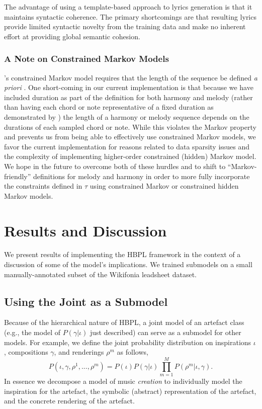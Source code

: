 \documentclass[letterpaper]{article}
\begin{document}
The advantage of using a template-based approach to lyrics generation is that it maintains syntactic coherence. The primary shortcomings are that resulting lyrics provide limited syntactic novelty from the training data and make no inherent effort at providing global semantic cohesion.

\subsubsection{A Note on Constrained Markov Models}

\citeauthor{pachet2001finite}'s constrained Markov model requires that the length of the sequence be defined \emph{a priori} . One short-coming in our current implementation is that because we have included duration as part of the definition for both harmony and melody (rather than having each chord or note representative of a fixed duration as demonstrated by \citeauthor{pachet2014imitative} ) the length of a harmony or melody sequence depends on the durations of each sampled chord or note. While this violates the Markov property and prevents us from being able to effectively use constrained Markov models, we favor the current implementation for reasons related to data sparsity issues and the complexity of implementing higher-order constrained (hidden) Markov model. We hope in the future to overcome both of these hurdles and to shift to ``Markov-friendly'' definitions for melody and harmony in order to more fully incorporate the constraints defined in $\tau$ using constrained Markov or constrained hidden Markov models.

\section{Results and Discussion}

We present results of implementing the HBPL framework in the context of a discussion of some of the model's implications. We trained submodels on a small manually-annotated subset of the Wikifonia leadsheet dataset.

\subsection{Using the Joint as a Submodel}

Because of the hierarchical nature of HBPL, a joint model of an artefact class (e.g., the model of $P(\gamma|\iota)$ just described) can serve as a submodel for other models. For example, we define the joint probability distribution on inspirations $\iota$, compositions $\gamma$, and renderings $\rho^{m}$ as follows,
\[ P(\iota,\gamma,\rho^1, ..., \rho^m) = P(\iota)P(\gamma|\iota) \prod_{m=1}^M P(\rho^m|\iota,\gamma). \]
In essence we decompose a model of music \emph{creation} to individually model the inspiration for the artefact, the symbolic (abstract) representation of the artefact, and the concrete rendering of the artefact. 
\end{document}
